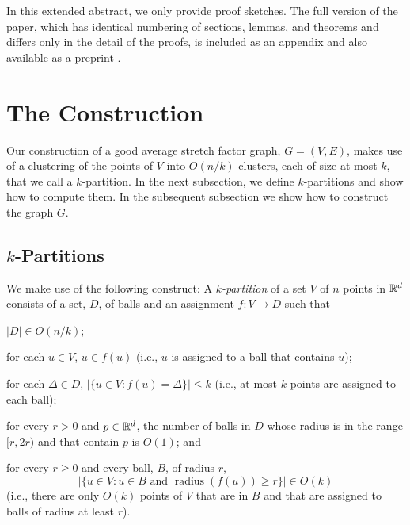 \documentclass{patmorin}
\DeclareMathOperator{\asf}{asf}
\DeclareMathOperator{\radius}{radius}
\begin{document}
In this extended abstract, we only provide proof sketches.  The full
version of the paper, which has identical numbering of sections,
lemmas, and theorems and differs only in the detail of the proofs,
is included as an appendix and also available as a preprint
\cite{dujmovic.morin.ea:average}.

\section{The Construction}

Our construction of a good average stretch factor graph, $G=(V,E)$,
makes use of a clustering of the points of $V$ into $O(n/k)$ clusters,
each of size at most $k$, that we call a $k$-partition.  In the next
subsection, we define $k$-partitions and show how to compute them.
In the subsequent subsection we show how to construct the graph $G$.



\subsection{$k$-Partitions}

We make use of the following construct:  A \emph{$k$-partition} of a
set $V$ of $n$ points in $\mathbb{R}^d$ consists of a set, $D$, of balls and an
assignment $f:V\to D$ such that
\begin{compactenum}
  \item $|D|\in O(n/k)$;
  \item for each $u\in V$, $u\in f(u)$ (i.e., $u$ is assigned to a
    ball that contains $u$);
  \item for each $\Delta\in D$, $|\{u\in V: f(u)=\Delta\}|\le k$ (i.e.,
   at most $k$ points are assigned to each ball);
  \item for every $r> 0$ and $p\in\mathbb{R}^d$, the number of balls
   in $D$ whose radius is in the range $[r,2r)$ and that contain $p$
   is $O(1)$; and
  \item for every $r\ge 0$ and every ball, $B$, of radius $r$, 
   \[
      |\{ u\in V : u\in B\text{ and } \radius(f(u))\ge r\}| \in O(k)
   \] 
   (i.e., there are only $O(k)$ points
   of $V$ that are in $B$ and that are assigned to balls of radius at
   least $r$).
\end{compactenum}
\end{document}
